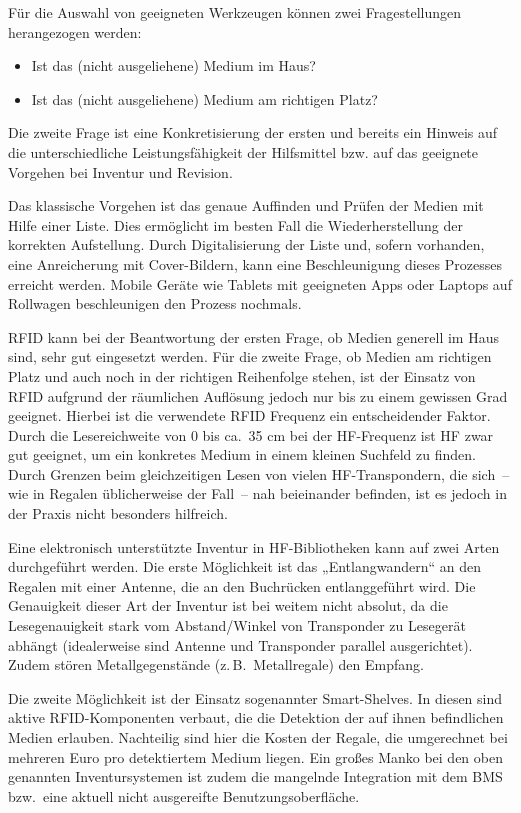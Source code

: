 \documentclass[
  11pt,
  letterpaper,
  DIV=11,
  twoside]{scrreprt}
\begin{document}
Für die Auswahl von geeigneten Werkzeugen können zwei Fragestellungen
herangezogen werden:

\begin{itemize}
\item
  Ist das (nicht ausgeliehene) Medium im Haus?
\item
  Ist das (nicht ausgeliehene) Medium am richtigen Platz?
\end{itemize}

Die zweite Frage ist eine Konkretisierung der ersten und bereits ein
Hinweis auf die unterschiedliche Leistungsfähigkeit der Hilfsmittel bzw.
auf das geeignete Vorgehen bei Inventur und Revision.

Das klassische Vorgehen ist das genaue Auffinden und Prüfen der Medien
mit Hilfe einer Liste. Dies ermöglicht im besten Fall die
Wiederherstellung der korrekten Aufstellung. Durch Digitalisierung der
Liste und, sofern vorhanden, eine Anreicherung mit Cover-Bildern, kann
eine Beschleunigung dieses Prozesses erreicht werden. Mobile Geräte wie
Tablets mit geeigneten Apps oder Laptops auf Rollwagen beschleunigen den
Prozess nochmals.

RFID kann bei der Beantwortung der ersten Frage, ob Medien generell im
Haus sind, sehr gut eingesetzt werden. Für die zweite Frage, ob Medien
am richtigen Platz und auch noch in der richtigen Reihenfolge stehen,
ist der Einsatz von RFID aufgrund der räumlichen Auflösung jedoch nur
bis zu einem gewissen Grad geeignet. Hierbei ist die verwendete RFID
Frequenz ein entscheidender Faktor. Durch die Lesereichweite von 0 bis
ca.~35 cm bei der HF-Frequenz ist HF zwar gut geeignet, um ein konkretes
Medium in einem kleinen Suchfeld zu finden. Durch Grenzen beim
gleichzeitigen Lesen von vielen HF-Transpondern, die sich~-- wie in
Regalen üblicherweise der Fall~-- nah beieinander befinden, ist es
jedoch in der Praxis nicht besonders hilfreich.

Eine elektronisch unterstützte Inventur in HF-Bibliotheken kann auf zwei
Arten durchgeführt werden. Die erste Möglichkeit ist das
„Entlangwandern`` an den Regalen mit einer Antenne, die an den
Buchrücken entlanggeführt wird. Die Genauigkeit dieser Art der Inventur
ist bei weitem nicht absolut, da die Lesegenauigkeit stark vom
Abstand/Winkel von Transponder zu Lesegerät abhängt (idealerweise sind
Antenne und Transponder parallel ausgerichtet). Zudem stören
Metallgegenstände (z.\,B.~Metallregale) den Empfang.

Die zweite Möglichkeit ist der Einsatz sogenannter Smart-Shelves. In
diesen sind aktive RFID-Komponenten verbaut, die die Detektion der auf
ihnen befindlichen Medien erlauben. Nachteilig sind hier die Kosten der
Regale, die umgerechnet bei mehreren Euro pro detektiertem Medium
liegen. Ein großes Manko bei den oben genannten Inventursystemen ist
zudem die mangelnde Integration mit dem BMS bzw.~eine aktuell nicht
ausgereifte Benutzungsoberfläche.
\end{document}

